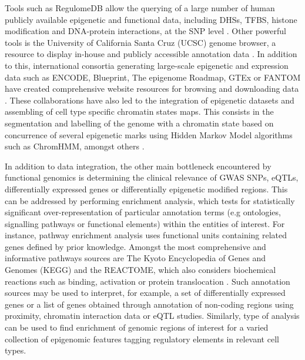 Tools such as RegulomeDB allow the querying of a large number of human publicly available epigenetic and functional data, including DHSs, TFBS, histone modification and DNA-protein interactions, at the SNP level \parencite{Boyle2012}. Other powerful tools is the University of California Santa Cruz (UCSC) genome browser, a resource to display in-house and publicly accessible annotation data \parencite{Kent2002}. In addition to this,  international consortia generating large-scale epigenetic and expression data such as ENCODE, Blueprint, The epigenome Roadmap, GTEx or FANTOM have created comprehensive website resources for browsing and downloading data \parencite{ENCODE2007,Londsdale2013, FANTOM2014,Adams2012 }. These collaborations have also led to the integration of epigenetic datasets and assembling of cell type specific chromatin states maps. This consists in the segmentation and labelling of the genome with a chromatin state based on concurrence of several epigenetic marks using Hidden Markov Model algorithms such as ChromHMM, amongst others \parencite{Ernst2010, Ernst2011,Hoffman2013, Kundaje2015 }. 

In addition to data integration, the other main bottleneck encountered by functional genomics is determining the clinical relevance of GWAS SNPs, eQTLs, differentially expressed genes or differentially epigenetic modified regions. This can be addressed by performing enrichment analysis, which tests for statistically significant over-representation of particular annotation terms (e.g ontologies, signalling pathways or functional elements) within the entities of interest. For instance, pathway enrichment analysis uses functional units containing related genes defined by prior knowledge. Amongst the most comprehensive and informative pathways sources are The Kyoto Encyclopedia of Genes and Genomes (KEGG) and the REACTOME, which also considers biochemical reactions such as binding, activation or protein translocation \parencite{Kanehisa2000, Fabregat2018}. Such annotation sources may be used to interpret, for example, a set of differentially expressed genes or a list of genes obtained through annotation of non-coding regions using proximity, chromatin interaction data or eQTL studies. Similarly, type of analysis can be used to find enrichment of genomic regions of interest for a varied collection of epigenomic features tagging regulatory elements in relevant cell types.%

